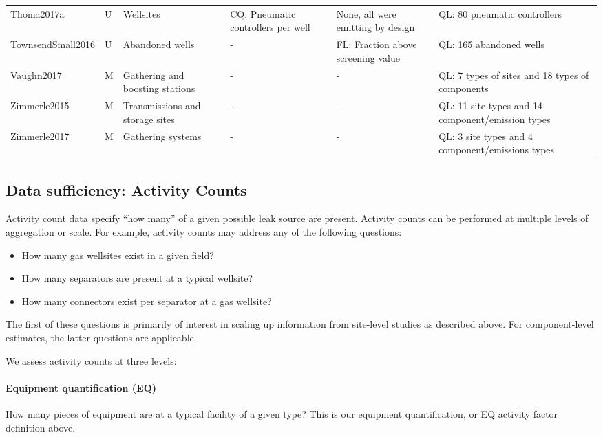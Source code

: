 \documentclass[11pt]{report}
\begin{document}
\begin{landscape}
\begin{table}[]
\begin{scriptsize}
\begin{tabular*}{1\columnwidth}{p{}p{}p{}p{}p{}p{}}
Thoma2017a  		& U         			& Wellsites    			& CQ: Pneumatic controllers per well   	& None, all were emitting by design         					& QL: 80 pneumatic controllers\\
TownsendSmall2016 & U         			& Abandoned wells        	& -      							& FL: Fraction above screening value        				& QL: 165 abandoned wells     \\
Vaughn2017 	 	& M         			& Gathering and boosting stations  & -      						& - 												& QL: 7 types of sites and 18 types of components \\
Zimmerle2015		& M         			& Transmissions and storage sites     & -      					& - 												& QL: 11 site types and 14 component/emission types         \\
Zimmerle2017		& M         			& Gathering systems      	& -      							& - 												& QL: 3 site types and 4 component/emissions types         \\
\bottomrule
\end{tabular*}
\end{scriptsize}
\end{table}
\end{landscape}


\subsection{Data sufficiency: Activity Counts}

Activity count data specify ``how many'' of a given possible leak source are present. Activity counts can be performed at multiple levels of aggregation or scale. For example, activity counts may address any of the following questions: 
\begin{itemize}
\item How many gas wellsites exist in a given field?
\item How many separators are present at a typical wellsite?
\item How many connectors exist per separator at a gas wellsite?
\end{itemize}

The first of these questions is primarily of interest in scaling up information from site-level studies as described above. For component-level estimates, the latter questions are applicable. 

We assess activity counts at three levels:
\paragraph{Equipment quantification (EQ)} How many pieces of equipment are at a typical facility of a given type? This is our equipment quantification, or EQ activity factor definition above.
\end{document}
